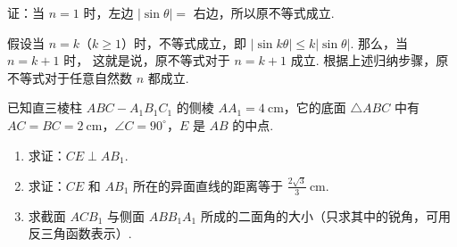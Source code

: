 \begin{solution}
证：当 \(n=1\) 时，左边 \(|\sin\theta|=\) 右边，所以原不等式成立.

假设当 \(n = k\)（\(k \geq 1\)）时，不等式成立，即
\(\left|\sin k\theta\right|\leqslant k\left|\sin\theta\right|\).
那么，当 \(n=k+1\) 时，
这就是说，原不等式对于 \(n = k + 1\) 成立. 根据上述归纳步骤，原不等式对于任意自然数 \(n\) 都成立.
\end{solution}

\begin{problem}

已知直三棱柱 \(ABC-A_1B_1C_1 \) 的侧棱 \(AA_1=4\mathrm{~cm} \)，它的底面 \(\triangle ABC \) 中有 \(AC=BC=2\mathrm{~cm} \)，\(\angle C=90^\circ \)，\(E\) 是 \(AB\) 的中点.

\begin{enumerate}
\item 求证：\(CE \perp AB_{1}\).
\item 求证：\(CE\) 和 \(AB_{1}\) 所在的异面直线的距离等于 \(\frac{2\sqrt{3}}{3}\mathrm{~cm}\).
\item 求截面 \(ACB_{1}\) 与侧面 \(ABB_{1}A_{1}\) 所成的二面角的大小（只求其中的锐角，可用反三角函数表示）.
\end{enumerate}
\end{problem}

